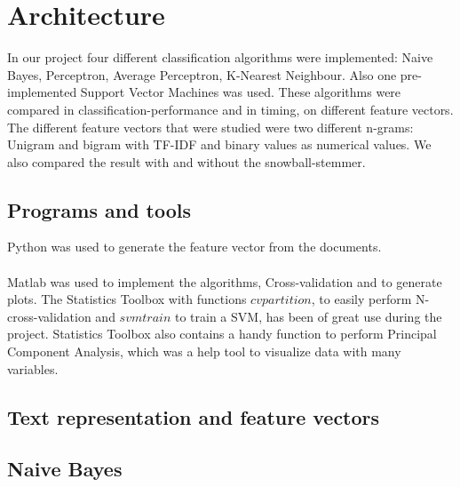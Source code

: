 \chapter{Architecture}
In our project four different classification algorithms were implemented: Naive Bayes, Perceptron, Average Perceptron, K-Nearest Neighbour. Also one pre-implemented Support Vector Machines was used. 
These algorithms were compared in classification-performance and in timing, on different feature vectors.
The different feature vectors that were studied were two different n-grams: Unigram and bigram with TF-IDF and binary values as numerical values. We also compared the result with and without the snowball-stemmer.
\section{Programs and tools}
Python was used to generate the feature vector from the documents. 
\\\\
Matlab was used to implement the algorithms, Cross-validation and to generate plots. The Statistics Toolbox with functions $cvpartition$, to easily perform N-cross-validation and $svmtrain$ to train a SVM, has been of great use during the project. Statistics Toolbox also contains a handy function to perform Principal Component Analysis, which was a help tool to visualize data with many variables. 

\section{Text representation and feature vectors}

\section{Naive Bayes}


